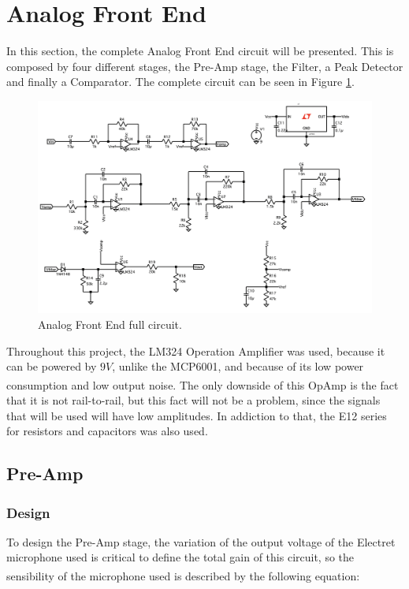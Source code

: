 
\section{Analog Front End}

In this section, the complete Analog Front End circuit will be presented. This is composed by four different stages, the Pre-Amp stage, the Filter, a Peak Detector and finally a Comparator. The complete circuit can be seen in Figure \ref{fig:CompleteAFE}.

\begin{figure}[H]
    \centering
    \includegraphics*[scale = 0.45]{Images/CompleteAFE.png}
    \caption{Analog Front End full circuit.}
    \label{fig:CompleteAFE}
\end{figure}

Throughout this project, the LM324 Operation Amplifier was used, because it can be powered by $9V$, unlike the MCP6001, and because of its low power consumption and low output noise\textsuperscript{\cite{lm324-datasheet}}. The only downside of this OpAmp is the fact that it is not rail-to-rail, but this fact will not be a problem, since the signals that will be used will have low amplitudes. In addiction to that, the E12 series for resistors and capacitors was also used. 
\subsection{Pre-Amp}

\subsubsection{Design}

To design the Pre-Amp stage, the variation of the output voltage of the Electret microphone used is critical to define the total gain of this circuit, so the sensibility of the microphone used is described by the following equation\textsuperscript{\cite{Lab-statement}}:

